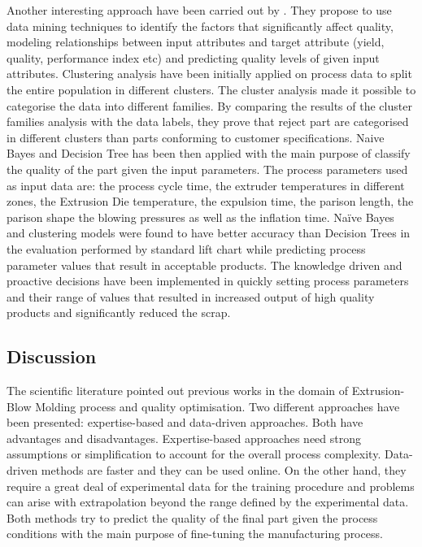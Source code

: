 Another interesting approach have been carried out by \citep{ramana2013data}. They propose to use data mining techniques to identify the factors that significantly affect quality, modeling relationships between input attributes and target attribute (yield, quality, performance index etc) and predicting quality levels of given input attributes. Clustering analysis have been initially applied on process data to split the entire population in different clusters. The cluster analysis made it possible to categorise the data into different families. By comparing the results of the cluster families analysis with the data labels, they prove that reject part are categorised in different clusters than parts conforming to customer specifications. Naive Bayes and Decision Tree has been then applied with the main purpose of classify the quality of the part given the input parameters. The process parameters used as input data are: the process cycle time, the extruder temperatures in different zones, the Extrusion Die temperature, the expulsion time, the parison length, the parison shape the blowing pressures as well as the inflation time. Naïve Bayes and clustering models were found to have better accuracy than Decision Trees in the evaluation performed by standard lift chart while predicting process parameter values that result in acceptable products. The knowledge driven and proactive decisions have been implemented in quickly setting process parameters and their range of values that resulted in increased output of high quality products and significantly reduced the scrap.

\subsection{Discussion} \label{Discussion}

The scientific literature pointed out previous works in the domain of Extrusion-Blow Molding process and quality optimisation. Two different approaches have been presented: expertise-based and data-driven approaches. Both have advantages and disadvantages. Expertise-based approaches need strong assumptions or simplification to account for the overall process complexity. Data-driven methods are faster and they can be used online. On the other hand, they require a great deal of experimental data for the training procedure and problems can arise with extrapolation beyond the range defined by the experimental data. Both methods try to predict the quality of the final part given the process conditions with the main purpose of fine-tuning the manufacturing process. 

